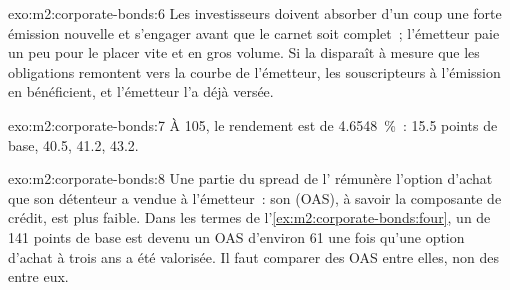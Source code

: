 \begin{solution}{exo:m2:corporate-bonds:6}
Les investisseurs doivent absorber d'un coup une forte émission nouvelle et s'engager avant que le carnet soit
complet~; l'émetteur paie un peu pour le placer vite et en gros volume. Si la 
disparaît à mesure que les obligations remontent vers la courbe de l'émetteur, les souscripteurs
à l'émission en bénéficient, et l'émetteur l'a déjà versée.
\end{solution}

\begin{solution}{exo:m2:corporate-bonds:7}
À 105, le rendement est de 4.6548~\%~:  15.5 points de base,  40.5,  41.2,
 43.2.
\end{solution}

\begin{solution}{exo:m2:corporate-bonds:8}
Une partie du spread de l' rémunère l'option d'achat que son détenteur a vendue à l'émetteur~: son
 (OAS), à savoir la composante de crédit, est plus faible. Dans
les termes de l'\cref{ex:m2:corporate-bonds:four}, un  de 141 points de base est devenu un OAS
d'environ 61 une fois qu'une option d'achat à trois ans a été valorisée. Il faut comparer des OAS
entre elles, non des  entre eux.
\end{solution}


